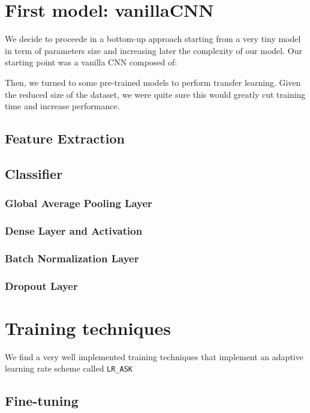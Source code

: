 \documentclass[conference,compsoc,11pt]{IEEEtran}
\begin{document}
\section{First model: vanillaCNN}
We decide to proceede in a bottom-up approach starting from a very tiny model in term of parameters size and increasing later the complexity of our model. Our starting point was a vanilla CNN composed of:

Then, we turned to some pre-trained models to perform transfer learning. Given the reduced size of the dataset, we were quite sure this would greatly cut training time and increase performance.

\subsection{Feature Extraction}\label{sec:features-extractor}


\subsection{Classifier}

\subsubsection{Global Average Pooling Layer}

\subsubsection{Dense Layer and Activation}


\subsubsection{Batch Normalization Layer}

\subsubsection{Dropout Layer}

\section{Training techniques}
We find a very well implemented training techniques that implement an adaptive learning rate scheme called \verb|LR_ASK|
\subsection{Fine-tuning}\label{sec:tuning}
\end{document}
